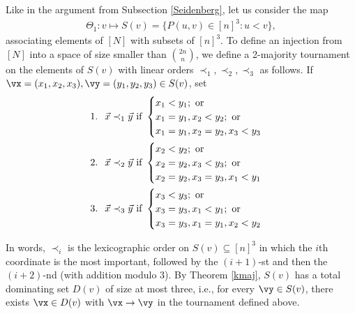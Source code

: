     Like in the argument from Subsection \ref{Seidenberg}, let us consider the map
    \begin{eqnarray*}
        \Theta_1: v \longmapsto S(v) = \{P(u,v) \in [n]^3: u < v\},
    \end{eqnarray*}
    associating elements of $[N]$ with subsets of $[n]^3$. 
    To define an injection from $[N]$ into a space of size smaller than ${2n \choose n}$, we define a 2-majority tournament on the elements of $S(v)$ with linear orders $\prec_1, \prec_2, \prec_3$ as follows.
    If $\vx = (x_1,x_2,x_3), \vy = (y_1,y_2,y_3) \in S(v)$, set
    \begin{align*}
        & 1. \hspace{0.25cm} \Vec{x} \prec_1 \Vec{y} \text{ if } \begin{cases}
            x_1 < y_1; \text{ or}\\
            x_1=y_1, x_2 < y_2; \text{ or}\\
            x_1=y_1, x_2=y_2, x_3 < y_3
        \end{cases}\\
        & 2. \hspace{0.25cm} \Vec{x} \prec_2 \Vec{y} \text{ if } \begin{cases}
            x_2 < y_2; \text{ or}\\
            x_2=y_2, x_3 < y_3; \text{ or}\\
            x_2=y_2, x_3=y_3, x_1 < y_1
        \end{cases}\\
        & 3. \hspace{0.25cm} \Vec{x} \prec_3 \Vec{y} \text{ if } \begin{cases}
            x_3 < y_3; \text{ or}\\
            x_3=y_3, x_1 < y_1; \text{ or}\\
            x_3=y_3, x_1=y_1, x_2 < y_2
        \end{cases}
    \end{align*}
    
    In words, $\prec_i$ is the lexicographic order on $S(v) \subseteq [n]^3$ in which the $i$th coordinate is the most important, followed by the $(i+1)$-st and then the $(i+2)$-nd (with addition modulo 3).
    By Theorem \ref{kmaj}, $S(v)$ has a total dominating set $D(v)$ of size at most three, i.e., for every $\vy \in S(v)$, there exists $\vx \in D(v)$ with $\vx \to \vy$ in the tournament defined above. 
    
